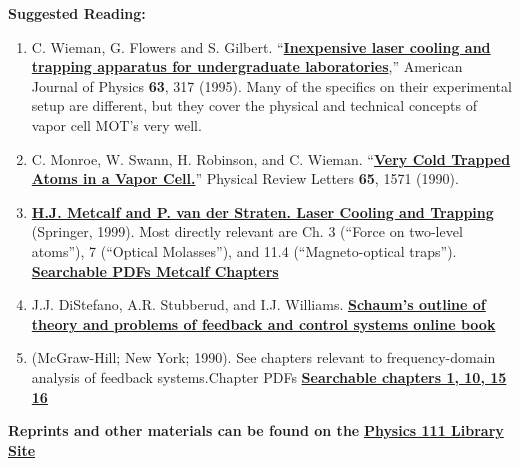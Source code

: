 \documentclass{../lab}
\begin{document}
\textbf{Suggested Reading:}

\begin{enumerate}
    \item C. Wieman, G. Flowers and S. Gilbert. ``\href{http://physics111.lib.berkeley.edu/Physics111/Reprints/MOT/MOT\_Plans.pdf}{\textbf{Inexpensive laser cooling and trapping apparatus for undergraduate laboratories}},'' American Journal of Physics \textbf{63}, 317 (1995). Many of the specifics on their experimental setup are different, but they cover the physical and technical concepts of vapor cell MOT's very well.

    \item C. Monroe, W. Swann, H. Robinson, and C. Wieman. ``\href{http://prl.aps.org/abstract/PRL/v65/i13/p1571\_1}{\textbf{Very Cold Trapped Atoms in a Vapor Cell.}}'' Physical Review Letters \textbf{65}, 1571 (1990). 

    \item \href{http://books.google.com/books?id=hDJPnSFh-g0C&dq=H.J.+Metcalf+and+P.+van+der+Straeten.+Laser+Cooling+and+Trapping+book&printsec=frontcover&source=bn&hl=en&ei=jMWaS4eRD4TuswPgytidAg&sa=X&oi=book\_result&ct=result&resnum=4&ved=0CBAQ6AEwAw#v=onepage&q=&f=false}{\textbf{H.J. Metcalf and P. van der Straten. Laser Cooling and Trapping}} (Springer, 1999). Most directly relevant are Ch. 3 (``Force on two-level atoms''), 7 (``Optical Molasses''), and 11.4 (``Magneto-optical traps''). \href{http://physics111.lib.berkeley.edu/Physics111/Reprints/MOT/Laser\_Cooling\_and\_Trapping\_HJ\_Metcalf/}{\textbf{Searchable PDFs Metcalf Chapters}}

    \item J.J. DiStefano, A.R. Stubberud, and I.J. Williams. \href{http://physics111.lib.berkeley.edu/Physics111/Reprints/MOT/Schaum's\%20Outline\%20Theory\%20and\%20Problems\%20of\%20Feedback\%20and\%20Control\%20Systems/}{\textbf{Schaum’s outline of theory and problems of feedback and control systems online book}}

    \item (McGraw-Hill; New York; 1990). See chapters relevant to frequency-domain analysis of feedback systems.Chapter PDFs \href{http://physics111.lib.berkeley.edu/Physics111/Reprints/MOT/Schaum's\%20Outline\%20Theory\%20and\%20Problems\%20of\%20Feedback\%20and\%20Control\%20Systems/}{\textbf{Searchable chapters 1, 10, 15 16}}
\end{enumerate}

\textbf{Reprints and other materials can be found on the} \href{http://physics111.lib.berkeley.edu/Physics111/Reprints/MOT/MOT\_index.html}{\textbf{Physics 111 Library Site}}
\end{document}
